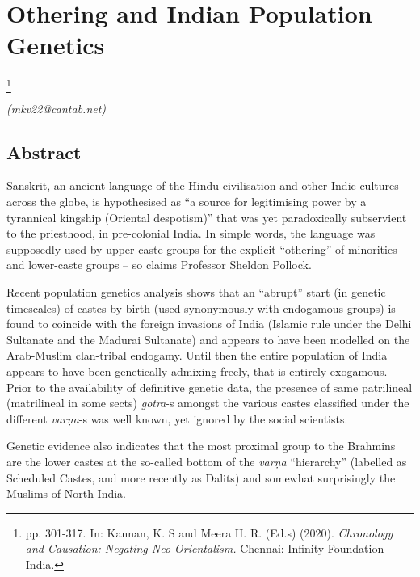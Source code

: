 
\chapter{\hspace{7.2cm} Othering \hfill\break and Indian Population Genetics}\label{chapter10}

\footnote{pp. 301-317. In: Kannan, K. S and Meera H. R. (Ed.s) (2020). \textit{Chronology and Causation: Negating Neo-Orientalism.} Chennai: Infinity Foundation India.}

\begin{flushright}
\textit{(mkv22@cantab.net)}
\end{flushright}

\setcounter{endnote}{0}

\section*{Abstract}

Sanskrit, an ancient language of the Hindu civilisation and other Indic cultures across the globe, is hypothesised as “a source for legitimising power by a tyrannical kingship (Oriental despotism)” that was yet paradoxically subservient to the priesthood, in pre-colonial India. In simple words, the language was supposedly used by upper-caste groups for the explicit “othering” of minorities and lower-caste groups – so claims Professor Sheldon Pollock.

Recent population genetics analysis shows that an “abrupt” start (in genetic timescales) of castes-by-birth (used synonymously with endogamous groups) is found to coincide with the foreign invasions of India (Islamic rule under the Delhi Sultanate and the Madurai Sultanate) and appears to have been modelled on the Arab-Muslim clan-tribal endogamy. Until then the entire population of India appears to have been genetically admixing freely, that is entirely exogamous. Prior to the availability of definitive genetic data, the presence of same patrilineal (matrilineal in some sects) \textit{gotra}-s amongst the various castes classified under the different \textit{varṇa}-s was well known, yet ignored by the social scientists.

Genetic evidence also indicates that the most proximal group to the Brahmins are the lower castes at the so-called bottom of the \textit{varṇa} “hierarchy” (labelled as Scheduled Castes, and more recently as Dalits) and somewhat surprisingly the Muslims of North India.

